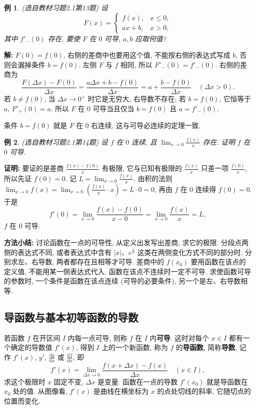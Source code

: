 \documentclass[UTF8,openany]{ctexbook}
\theoremstyle{chinesetextbook}
\newtheorem{example}{例}[section]
\newenvironment{cnproof}{\par\indent\textbf{证明:} \ignorespaces}{\par}
\newenvironment{cnsolution}{\par\indent\textbf{解:} \ignorespaces}{\par}
\newcommand{\dd}{\mathrm d}
\begin{document}
\begin{example}\label{ex:c2-h1-13}
\textnormal{(选自教材习题2.1第13题)} 设
\[
F(x)=\begin{cases}f(x),&x\le0,\\ax+b,&x>0,\end{cases}
\]
其中 $f'_-(0)$ 存在. 要使 $F$ 在 $0$ 可导, $a,b$ 应取何值?
\end{example}
\begin{cnsolution}
$F(0)=f(0)$, 右侧的差商中也要用这个值, 不能按右侧的表达式写成 $b$, 否则会漏掉条件 $b=f(0)$. 左侧 $F$ 与 $f$ 相同, 所以 $F'_-(0)=f'_-(0)$. 右侧的差商为
\[
\frac{F(\Delta x)-F(0)}{\Delta x}=\frac{a\Delta x+b-f(0)}{\Delta x}=a+\frac{b-f(0)}{\Delta x}\quad(\Delta x>0).
\]
若 $b\ne f(0)$, 当 $\Delta x\to0^+$ 时它是无穷大, 右导数不存在; 若 $b=f(0)$, 它恒等于 $a$, $F'_+(0)=a$. 所以 $F$ 在 $0$ 可导当且仅当 $b=f(0)$ 且 $a=f'_-(0)$.
\end{cnsolution}
条件 $b=f(0)$ 就是 $F$ 在 $0$ 右连续, 这与可导必连续的定理一致.
\begin{example}\label{ex:c2-h1-14}
\textnormal{(选自教材习题2.1第14题)} 设 $f$ 在 $0$ 连续, 且 $\displaystyle\lim_{x\to0}\frac{f(x)}x$ 存在. 证明 $f$ 在 $0$ 可导.
\end{example}
\begin{cnproof}
要证的是差商 $\displaystyle\frac{f(x)-f(0)}x$ 有极限, 它与已知有极限的 $\displaystyle\frac{f(x)}x$ 只差一项 $\displaystyle\frac{f(0)}x$, 所以先证 $f(0)=0$. 记 $\displaystyle L=\lim_{x\to0}\frac{f(x)}x$. 由积的法则 $\displaystyle\lim_{x\to0}f(x)=\lim_{x\to0}\left(\frac{f(x)}x\cdot x\right)=L\cdot0=0$, 再由 $f$ 在 $0$ 连续得 $f(0)=0$. 于是
\[
f'(0)=\lim_{x\to0}\frac{f(x)-f(0)}{x-0}=\lim_{x\to0}\frac{f(x)}x=L,
\]
$f$ 在 $0$ 可导.
\end{cnproof}
\par\indent\textbf{方法小结:} 讨论函数在一点的可导性, 从定义出发写出差商, 求它的极限. 分段点两侧的表达式不同, 或者表达式中含有 $|x|$、$e^{\frac1x}$ 这类在两侧变化方式不同的部分时, 分别求左、右导数, 两者都存在且相等才可导. 差商中的 $f(x_0)$ 要用函数在该点的定义值, 不能用某一侧表达式代入. 函数在该点不连续时一定不可导. 求使函数可导的参数时, 一个条件是函数在该点连续 (可导的必要条件), 另一个是左、右导数相等.
\subsection{导函数与基本初等函数的导数}
若函数 $f$ 在开区间 $I$ 内每一点可导, 则称 $f$ 在 $I$ 内\textbf{可导}. 这时对每个 $x\in I$ 都有一个确定的导数值 $f'(x)$, 得到 $I$ 上的一个新函数, 称为 $f$ 的\textbf{导函数}, 简称\textbf{导数}, 记作 $f'(x)$, $y'$, $\displaystyle\frac{\dd y}{\dd x}$ 或 $\displaystyle\frac{\dd f}{\dd x}$, 即
\[
f'(x)=\lim_{\Delta x\to0}\frac{f(x+\Delta x)-f(x)}{\Delta x}\quad(x\in I),
\]
求这个极限时 $x$ 固定不变, $\Delta x$ 是变量. 函数在一点的导数 $f'(x_0)$ 就是导函数在 $x_0$ 处的值. 从图像看, $f'(x)$ 是曲线在横坐标为 $x$ 的点处切线的斜率, 它随切点的位置而变化.
\end{document}
